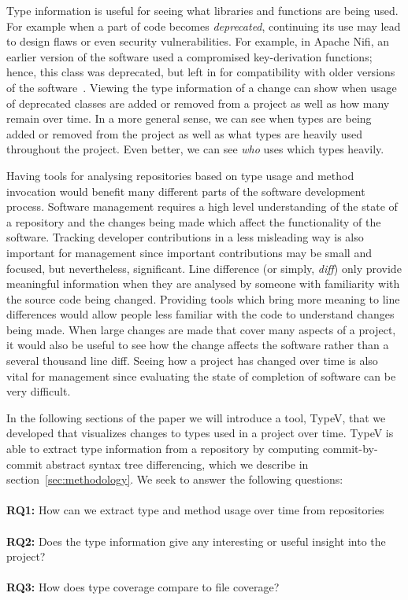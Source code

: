 \documentclass[conference]{IEEEtran}
\begin{document}
Type information is useful for seeing what libraries and functions are being used.  For example when a part of code becomes \emph{deprecated}, continuing its use may lead to design flaws or even security vulnerabilities. For example, in Apache Nifi, an earlier version of the software used a compromised key-derivation functions; hence, this class was deprecated, but left in for compatibility with older versions of the software~\cite{nifi}. Viewing the type information of a change can show when usage of deprecated classes are added or removed from a project as well as how many remain over time. In a more general sense, we can see when types are being added or removed from the project as well as what types are heavily used throughout the project. Even better, we can see \emph{who} uses which types heavily.

Having tools for analysing repositories based on type usage and method invocation would benefit many different parts of the software development process. Software management requires a high level understanding of the state of a repository and the changes being made which affect the functionality of the software. Tracking developer contributions in a less misleading way is also important for management since important contributions may be small and focused, but nevertheless, significant. Line difference (or simply, \emph{diff}) only provide meaningful information when they are analysed by someone with familiarity with the source code being changed. Providing tools which bring more meaning to line differences would allow people less familiar with the code to understand changes being made. When large changes are made that cover many aspects of a project, it would also be useful to see how the change affects the software rather than a several thousand line diff.  Seeing how a project has changed over time is also vital for management since evaluating the state of completion of software can be very difficult.

In the following sections of the paper we will introduce a tool, TypeV, that we developed that visualizes changes to types used in a project over time. TypeV is able to extract type information from a repository by computing commit-by-commit abstract syntax tree differencing, which we describe in section~\ref{sec:methodology}. We seek to answer the following questions: \\ \\
\textbf{RQ1:} How can we extract type and method usage over time from repositories \\ \\
\textbf{RQ2:} Does the type information give any interesting or useful insight into the project? \\ \\
\textbf{RQ3:} How does type coverage compare to file coverage?
\end{document}
